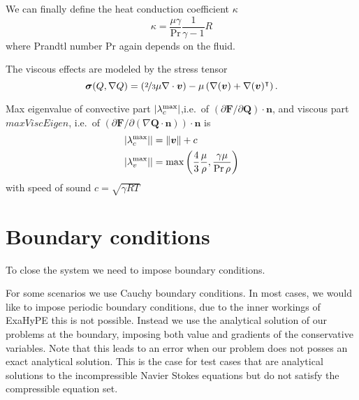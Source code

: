 We can finally define the heat conduction coefficient $\kappa$
\begin{equation}
  \label{eq:heat-conduction-coeff}
  \kappa = \frac{\mu \gamma}{\Pr} \frac{1}{\gamma - 1} R
\end{equation}
where Prandtl number $\text{Pr}$ again depends on the fluid.


The viscous effects are modeled by the stress tensor
\begin{equation}
  \label{eq:stress-tensor}
  \bm{\sigma}(Q, \nabla Q) = \left(\nicefrac{2}{3} \mu \nabla \cdot \bm{v} \right) -
  \mu \left( \nabla (\bm{v}) + \nabla ( \bm{v} )^\intercal \right).
\end{equation}

Max eigenvalue of convective part $\vert \lambda_c^{\text{max}} \vert$,i.e.\ of $\left( \partial \bm{F}/\partial \bm{Q}\right) \cdot \bm{n}$,
and viscous part $maxViscEigen$, i.e.\ of $\left( \partial \bm{F}/\partial \left( \nabla \bm{Q} \cdot \bm{n} \right)\right) \cdot \bm{n}$
is
\begin{align}
  \vert \lambda_c^{\text{max}} \vert \vert  &= \Vert \bm{v} \Vert + c\\
  \vert \lambda_v^{\text{max}} \vert \vert &= \max \left( \frac{4}{3} \frac{\mu}{\rho}
                                       , \frac{\gamma \mu}{\Pr \rho} \right)
\end{align}
with speed of sound $c = \sqrt{\gamma R T }$


\section{Boundary conditions}
To close the system we need to impose boundary conditions.

For some scenarios we use Cauchy boundary conditions.
In most cases, we would like to impose periodic boundary conditions, due to the inner workings of ExaHyPE this is not possible.
Instead we use the analytical solution of our problems at the boundary, imposing both value and gradients of the conservative variables.
Note that this leads to an error when our problem does not posses an exact analytical solution.
This is the case for test cases that are analytical solutions to the incompressible Navier Stokes equations but do not satisfy the compressible equation set.

